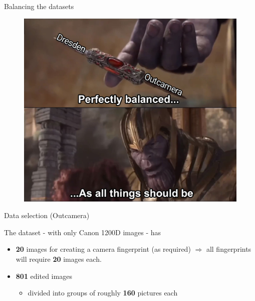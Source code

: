 \begin{frame}{Balancing the datasets}

\begin{figure}
    \centering
    \includegraphics[height=0.78\textheight]{../drawable/meme.png}
\end{figure}
    
\end{frame}

\begin{frame}{Data selection (Outcamera)}

    The dataset - with only Canon 1200D images - has 
    
    \begin{itemize}
        \item \textbf{20} images for creating a camera fingerprint (as required) $\Rightarrow$ all fingerprints will require \textbf{20} images each. 
        \item \textbf{801} edited images \begin{itemize}
            \item divided into groups of roughly \textbf{160} pictures each
        \end{itemize}
    \end{itemize}
    
    \medskip 
    
    
\end{frame}

